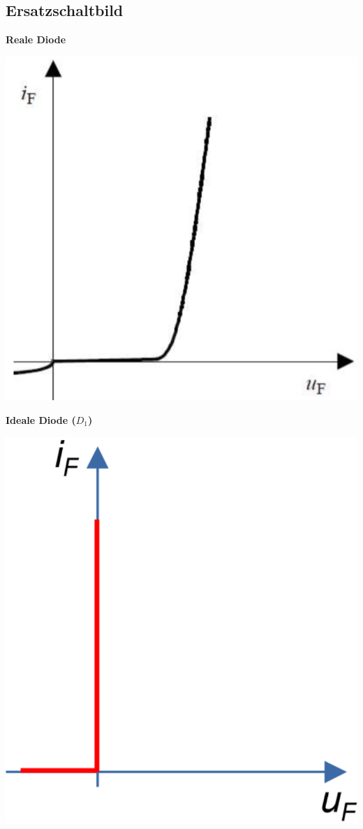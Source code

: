 \subsection{Ersatzschaltbild}
\begin{multicols}{4}
    \begin{minipage}{\linewidth}
        \textbf{Reale Diode} \raggedright \newline\newline
        \includegraphics[width=0.7\linewidth]{images/realeDiode}
    \end{minipage}
    
    \begin{minipage}{\linewidth}
        \textbf{Ideale Diode ($ D_1 $)} \raggedright \newline\newline
        \includegraphics[width=0.7\linewidth]{images/idealeDiode}
    \end{minipage}
    

\end{multicols}
